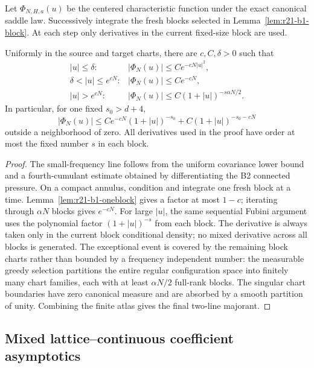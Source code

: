 Let $\Phi_{N,H,a}(u)$ be the centered characteristic function under the exact
canonical saddle law.  Successively integrate the fresh blocks selected in
Lemma~\ref{lem:r21-b1-block}.  At each step only derivatives in the current
fixed-size block are used.

\begin{theorem}
\label{thm:r21-b1-fourier}
Uniformly in the source and target charts, there are $c,C,\delta>0$ such that
\[
\begin{array}{ll}
|u|\le\delta:&
 |\Phi_N(u)|\le Ce^{-cN|u|^2},\\[1mm]
\delta<|u|\le e^{cN}:&
 |\Phi_N(u)|\le Ce^{-cN},\\[1mm]
|u|>e^{cN}:&
 |\Phi_N(u)|\le C(1+|u|)^{-s\alpha N/2}.
\end{array}
\]
In particular, for one fixed $s_0>d+4$,
\[
 |\Phi_N(u)|\le C e^{-cN}(1+|u|)^{-s_0}
 +C(1+|u|)^{-s_0-cN}
\]
outside a neighborhood of zero.  All derivatives used in the proof have
order at most the fixed number $s$ in each block.
\end{theorem}

\begin{proof}
The small-frequency line follows from the uniform covariance lower bound and
a fourth-cumulant estimate obtained by differentiating the B2 connected
pressure.  On a compact annulus, condition and integrate one fresh block at a
time.  Lemma~\ref{lem:r21-b1-oneblock} gives a factor at most $1-c$; iterating
through $\alpha N$ blocks gives $e^{-cN}$.  For large $|u|$, the same sequential
Fubini argument uses the polynomial factor $(1+|u|)^{-s}$ from each block.
The derivative is always taken only in the current block conditional density;
no mixed derivative across all blocks is generated.  The exceptional event is
covered by the remaining block charts rather than bounded by a frequency
independent number: the measurable greedy selection partitions the entire
regular configuration space into finitely many chart families, each with at
least $\alpha N/2$ full-rank blocks.  The singular chart boundaries have zero
canonical measure and are absorbed by a smooth partition of unity.  Combining
the finite atlas gives the final two-line majorant.
\end{proof}

\subsection{Mixed lattice--continuous coefficient asymptotics}


